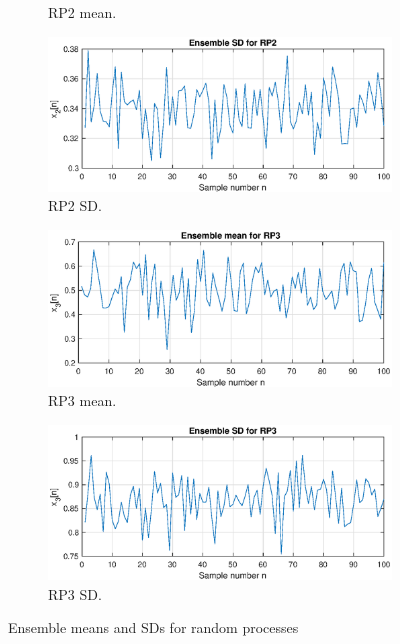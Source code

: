 \begin{figure}[H]
\begin{center}
\begin{subfigure}{0.4\textwidth}
  \caption{RP2 mean.}
  \label{fig:rp2mean}
\end{subfigure}\hfil 
\begin{subfigure}{0.4\textwidth}
  \includegraphics[width=\linewidth]{assignment1figs/RP2_SD.eps}
  \caption{RP2 SD.}
  \label{fig:rp2SD}
\end{subfigure}
\medskip
\begin{subfigure}{0.4\textwidth}
  \includegraphics[width=\linewidth]{assignment1figs/RP3_mean.eps}
  \caption{RP3 mean.}
  \label{fig:rp3mean}
\end{subfigure}\hfil 
\begin{subfigure}{0.4\textwidth}
  \includegraphics[width=\linewidth]{assignment1figs/RP3_SD.eps}
  \caption{RP3 SD.}
  \label{fig:rp3SD}
\end{subfigure}
\caption{Ensemble means and SDs for random processes}
\label{fig:rps}
\end{center}
\end{figure}

